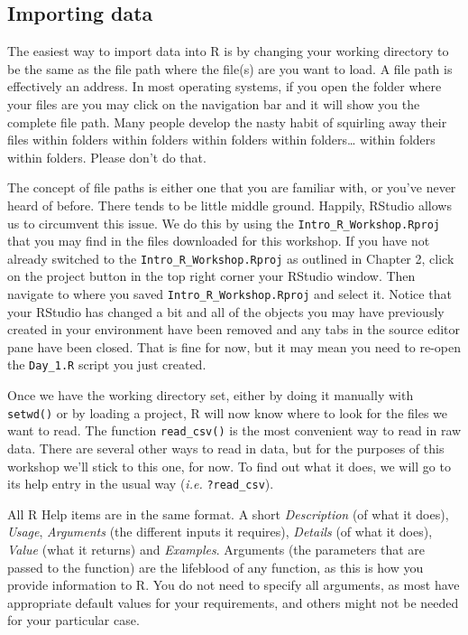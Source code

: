 \documentclass[]{book}
\theoremstyle{definition}
\theoremstyle{definition}
\theoremstyle{definition}
\theoremstyle{remark}
\begin{document}
\subsection{Importing data}\label{importing-data}

The easiest way to import data into R is by changing your working
directory to be the same as the file path where the file(s) are you want
to load. A file path is effectively an address. In most operating
systems, if you open the folder where your files are you may click on
the navigation bar and it will show you the complete file path. Many
people develop the nasty habit of squirling away their files within
folders within folders within folders within folders\ldots{} within
folders within folders. Please don't do that.

The concept of file paths is either one that you are familiar with, or
you've never heard of before. There tends to be little middle ground.
Happily, RStudio allows us to circumvent this issue. We do this by using
the \texttt{Intro\_R\_Workshop.Rproj} that you may find in the files
downloaded for this workshop. If you have not already switched to the
\texttt{Intro\_R\_Workshop.Rproj} as outlined in Chapter 2, click on the
project button in the top right corner your RStudio window. Then
navigate to where you saved \texttt{Intro\_R\_Workshop.Rproj} and select
it. Notice that your RStudio has changed a bit and all of the objects
you may have previously created in your environment have been removed
and any tabs in the source editor pane have been closed. That is fine
for now, but it may mean you need to re-open the \texttt{Day\_1.R}
script you just created.

Once we have the working directory set, either by doing it manually with
\texttt{setwd()} or by loading a project, R will now know where to look
for the files we want to read. The function \texttt{read\_csv()} is the
most convenient way to read in raw data. There are several other ways to
read in data, but for the purposes of this workshop we'll stick to this
one, for now. To find out what it does, we will go to its help entry in
the usual way (\emph{i.e.} \texttt{?read\_csv}).

All R Help items are in the same format. A short \emph{Description} (of
what it does), \emph{Usage}, \emph{Arguments} (the different inputs it
requires), \emph{Details} (of what it does), \emph{Value} (what it
returns) and \emph{Examples}. Arguments (the parameters that are passed
to the function) are the lifeblood of any function, as this is how you
provide information to R. You do not need to specify all arguments, as
most have appropriate default values for your requirements, and others
might not be needed for your particular case.
\end{document}
